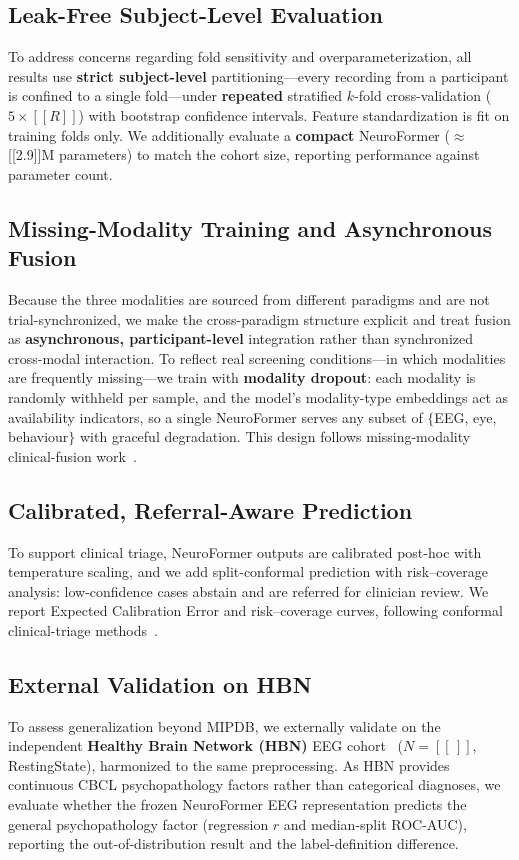 \subsection{Leak-Free Subject-Level Evaluation}
To address concerns regarding fold sensitivity and overparameterization, all
results use \textbf{strict subject-level} partitioning---every recording from a
participant is confined to a single fold---under \textbf{repeated} stratified
$k$-fold cross-validation ($5\times[[R]]$) with bootstrap confidence intervals.
Feature standardization is fit on training folds only. We additionally evaluate a
\textbf{compact} NeuroFormer ($\approx$[[2.9]]M parameters) to match the cohort
size, reporting performance against parameter count.

\subsection{Missing-Modality Training and Asynchronous Fusion}
Because the three modalities are sourced from different paradigms and are not
trial-synchronized, we make the cross-paradigm structure explicit and treat fusion
as \textbf{asynchronous, participant-level} integration rather than synchronized
cross-modal interaction. To reflect real screening conditions---in which modalities
are frequently missing---we train with \textbf{modality dropout}: each modality is
randomly withheld per sample, and the model's modality-type embeddings act as
availability indicators, so a single NeuroFormer serves any subset of
$\{$EEG, eye, behaviour$\}$ with graceful degradation. This design follows
missing-modality clinical-fusion work~\cite{DrFuse2024}.

\subsection{Calibrated, Referral-Aware Prediction}
To support clinical triage, NeuroFormer outputs are calibrated post-hoc with
temperature scaling, and we add split-conformal prediction with risk--coverage
analysis: low-confidence cases abstain and are referred for clinician review. We
report Expected Calibration Error and risk--coverage curves, following conformal
clinical-triage methods~\cite{ConformalTriage2025}.

\subsection{External Validation on HBN}
To assess generalization beyond MIPDB, we externally validate on the independent
\textbf{Healthy Brain Network (HBN)} EEG cohort~\cite{HBNEEG2024}
($N\!=\![[\,]]$, RestingState), harmonized to the same preprocessing. As HBN
provides continuous CBCL psychopathology factors rather than categorical
diagnoses, we evaluate whether the frozen NeuroFormer EEG representation predicts
the general psychopathology factor (regression $r$ and median-split ROC-AUC),
reporting the out-of-distribution result and the label-definition
difference.
